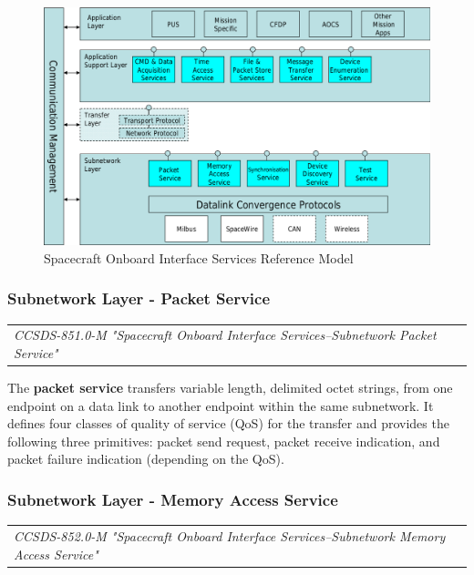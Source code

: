 \begin{figure}[h]
\centering\includegraphics[scale=0.4]{fig/spacecraft_onboard_interface_services_reference_model}
\caption{Spacecraft Onboard Interface Services Reference Model}
\label{fig:Spacecraft Onboard Interface Services Reference Model}
\end{figure}


\subsubsection{Subnetwork Layer - Packet Service}

\begin{tabular}{l}
\textit{CCSDS-851.0-M "Spacecraft Onboard Interface Services--Subnetwork Packet Service" \cite{CCSDS-851.0-M}} 
\end{tabular}

The \textbf{packet service} transfers variable length, delimited octet strings, from one endpoint on a data link to another endpoint within the same subnetwork. It defines four classes of quality of service (QoS) for the transfer and provides the following three primitives: packet send request, packet receive indication, and packet failure indication (depending on the QoS).

\subsubsection{Subnetwork Layer - Memory Access Service}

\begin{tabular}{l}
\textit{CCSDS-852.0-M "Spacecraft Onboard Interface Services--Subnetwork Memory Access Service" \cite{CCSDS-852.0-M}} 
\end{tabular}

